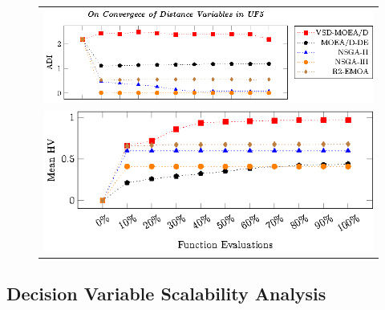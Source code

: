 \begin{figure}[t]
\centering
\begin{tabular}{l}
 \includegraphics[scale=0.8]{images/Diversity_Long_Term_tikz_UF5-figure0.eps}\\[0cm]%
 \includegraphics[scale=0.8]{images/Diversity_Long_Term_tikz_UF5-figure1.eps}\\[0cm]%
\end{tabular}
\end{figure}



\subsection{Decision Variable Scalability Analysis}

